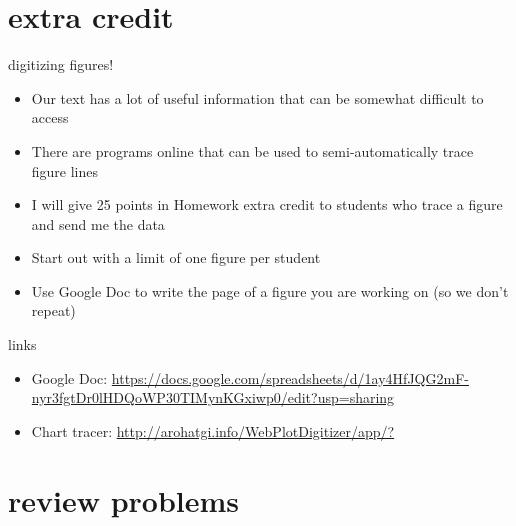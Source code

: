 \documentclass[10pt]{beamer}
\begin{document}
\section{extra credit}

\begin{frame}{digitizing figures!}
	\begin{itemize}[<+->]
		\item Our text has a lot of useful information that can be somewhat difficult to access
		\item There are programs online that can be used to semi-automatically trace figure lines
		\item I will give 25 points in Homework extra credit to students who trace a figure and send me the data
		\item Start out with a limit of one figure per student
		\item Use Google Doc to write the page of a figure you are working on (so we don't repeat)
	\end{itemize}
\end{frame}

\begin{frame}{links}
	\begin{itemize}
		\item Google Doc: \url{https://docs.google.com/spreadsheets/d/1ay4HfJQG2mF-nyr3fgtDr0lHDQoWP30TIMynKGxiwp0/edit?usp=sharing}
		\item Chart tracer:
		\url{http://arohatgi.info/WebPlotDigitizer/app/?}
	\end{itemize}
\end{frame}

\section{review problems}
\end{document}
